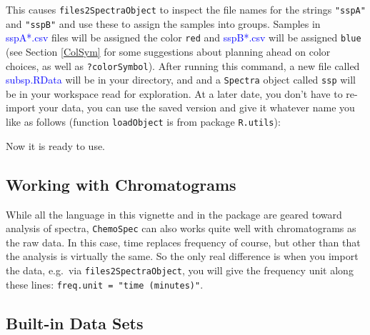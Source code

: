 \documentclass[letter,10pt,twocolumn,twoside,printwatermark=false]{pinp}
\begin{document}
This causes \texttt{files2SpectraObject} to inspect the file names for
the strings \texttt{"sspA"} and \texttt{"sspB"} and use these to assign
the samples into groups. Samples in \textcolor{blue}{sspA*.csv} files
will be assigned the color \texttt{red} and \textcolor{blue}{sspB*.csv}
will be assigned \texttt{blue} (see Section \ref{ColSym} for some
suggestions about planning ahead on color choices, as well as
\texttt{?colorSymbol}). After running this command, a new file called
\textcolor{blue}{subsp.RData} will be in your directory, and and a
\texttt{Spectra} object called \texttt{ssp} will be in your workspace
read for exploration. At a later date, you don't have to re-import your
data, you can use the saved version and give it whatever name you like
as follows (function \texttt{loadObject} is from package
\texttt{R.utils}):

\begin{Shaded}
\begin{Highlighting}[]
\StringTok{ }\NormalTok{(}\NormalTok{)}
\end{Highlighting}
\end{Shaded}

Now it is ready to use.

\hypertarget{working-with-chromatograms}{%
\subsection{Working with
Chromatograms}\label{working-with-chromatograms}}

While all the language in this vignette and in the package are geared
toward analysis of spectra, \texttt{ChemoSpec} can also works quite well
with chromatograms as the raw data. In this case, time replaces
frequency of course, but other than that the analysis is virtually the
same. So the only real difference is when you import the data, e.g.~via
\texttt{files2SpectraObject}, you will give the frequency unit along
these lines: \texttt{freq.unit = "time (minutes)"}.

\hypertarget{built-in-data-sets}{%
\subsection{Built-in Data Sets}\label{built-in-data-sets}}
\end{document}
